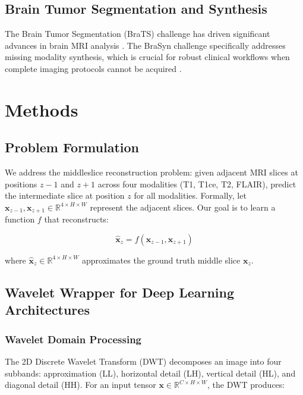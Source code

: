 \documentclass[conference]{IEEEtran}
\begin{document}
\subsection{Brain Tumor Segmentation and Synthesis}

The Brain Tumor Segmentation (BraTS) challenge has driven significant advances in brain MRI analysis \cite{menze2015multimodal, baid2021rsna}. The BraSyn challenge specifically addresses missing modality synthesis, which is crucial for robust clinical workflows when complete imaging protocols cannot be acquired \cite{li2023brain}.

\section{Methods}

\subsection{Problem Formulation}

We address the middleslice reconstruction problem: given adjacent MRI slices at positions $z-1$ and $z+1$ across four modalities (T1, T1ce, T2, FLAIR), predict the intermediate slice at position $z$ for all modalities. Formally, let $\mathbf{x}_{z-1}, \mathbf{x}_{z+1} \in \mathbb{R}^{4 \times H \times W}$ represent the adjacent slices. Our goal is to learn a function $f$ that reconstructs:

\begin{equation}
\hat{\mathbf{x}}_z = f(\mathbf{x}_{z-1}, \mathbf{x}_{z+1})
\end{equation}

where $\hat{\mathbf{x}}_z \in \mathbb{R}^{4 \times H \times W}$ approximates the ground truth middle slice $\mathbf{x}_z$.

\subsection{Wavelet Wrapper for Deep Learning Architectures}

\subsubsection{Wavelet Domain Processing}

The 2D Discrete Wavelet Transform (DWT) decomposes an image into four subbands: approximation (LL), horizontal detail (LH), vertical detail (HL), and diagonal detail (HH). For an input tensor $\mathbf{x} \in \mathbb{R}^{C \times H \times W}$, the DWT produces:
\end{document}
